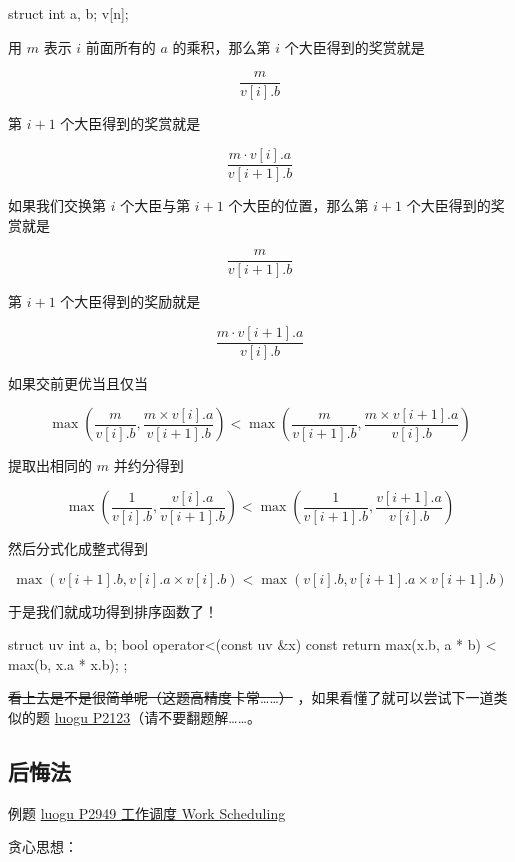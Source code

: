 \begin{cppcode}
struct {
  int a, b;
} v[n];
\end{cppcode}

用 $m$ 表示 $i$ 前面所有的 $a$ 的乘积，那么第 $i$ 个大臣得到的奖赏就是 

$$
\frac{m} {v[i].b}
$$

第 $i + 1$ 个大臣得到的奖赏就是 

$$
\frac{m \cdot v[i].a} {v[i + 1].b}
$$

如果我们交换第 $i$ 个大臣与第 $i + 1$ 个大臣的位置，那么第 $i + 1$ 个大臣得到的奖赏就是 

$$
\frac{m} {v[i + 1].b}
$$

第 $i + 1$ 个大臣得到的奖励就是 

$$
\frac{m \cdot v[i + 1].a} {v[i].b}
$$

如果交前更优当且仅当 

$$
\max (\frac{m} {v[i].b}, \frac{m \times v[i].a} {v[i + 1].b})  < \max (\frac{m} {v[i + 1].b}, \frac{m \times v[i + 1].a} {v[i].b})
$$

提取出相同的 $m$ 并约分得到 

$$
\max(\frac{1} {v[i].b}, \frac{v[i].a} {v[i + 1].b}) < \max(\frac{1} {v[i + 1].b}, \frac{v[i + 1].a} {v[i].b})
$$

然后分式化成整式得到 

$$
\max(v[i + 1].b, v[i].a \times v[i].b) < \max(v[i].b, v[i + 1].a \times v[i + 1].b)
$$

于是我们就成功得到排序函数了！

\begin{cppcode}
struct uv {
  int a, b;
  bool operator<(const uv &x) const {
    return max(x.b, a * b) < max(b, x.a * x.b);
  }
};
\end{cppcode}

\sout{看上去是不是很简单呢（这题高精度卡常……）} ，如果看懂了就可以尝试下一道类似的题 \href{https://www.luogu.org/problemnew/show/P2123}{luogu P2123}（请不要翻题解……。

\subsection{后悔法}

\begin{NOTE}{例题 \href{https://www.luogu.org/problemnew/show/P2949}{luogu P2949 工作调度 Work Scheduling}}{}

\end{NOTE}


贪心思想：

